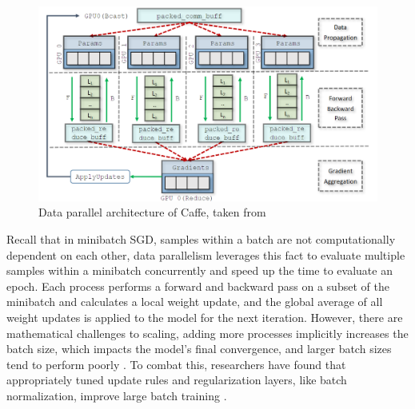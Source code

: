 \begin{figure}
    \centering
    \includegraphics[width=15cm]{3_Chapters/3_Chapter_DistributedDL/Figs/Caffee_DP_arch.png}
    \caption{Data parallel architecture of Caffe, taken from \cite{Awan2017InDepthPerfCharOfDNN}}
    \label{fig:caffe-dp-arch}
\end{figure}

Recall that in minibatch SGD, samples within a batch are not computationally dependent on each other, data parallelism leverages this fact to evaluate multiple samples within a minibatch concurrently and speed up the time to evaluate an epoch. 
Each process performs a forward and backward pass on a subset of the minibatch and calculates a local weight update, and the global average of all weight updates is applied to the model for the next iteration.
However, there are mathematical challenges to scaling, adding more processes implicitly increases the batch size, which impacts the model's final convergence, and larger batch sizes tend to perform poorly \cite{Keskar2016LargeBatchTraining}.
To combat this, researchers have found that appropriately tuned update rules and regularization layers, like batch normalization, improve large batch training \cite{You2018ImgNetInMin, Goyal2017FacebookImgNet1Hour}. 

